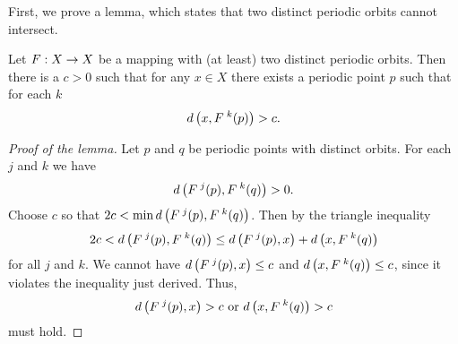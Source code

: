 \documentclass[10pt,draft,twoside]{book}
\begin{document}
First, we prove a lemma, which states that two distinct periodic orbits cannot intersect.
\begin{lemma}
  Let $F: X\rightarrow X$ be a mapping with (at least) two distinct periodic orbits.
  Then there is a $c > 0$ such that for any $x\in X$ there exists a periodic
  point $p$ such that for each $k$
  \begin{equation*}
    d\left( x, F^{\;k}(p) \right) > c.
  \end{equation*}
  \label{lem:dev1}
  \begin{proof}[Proof of the lemma]
    Let $p$ and $q$ be periodic points with distinct orbits. For each $j$ and $k$ we have
    \begin{equation*}
      d\left( F^{\;j}(p), F^{\;k}(q) \right) > 0.
    \end{equation*}
    Choose $c$ so that $2c < \min d\left( F^{\;j}(p),F^{\;k}(q) \right)$.
    Then by the triangle inequality
    \begin{equation*}
      2c < d\left( F^{\;j}(p),F^{\;k}(q) \right) \leq d\left( F^{\;j}(p),x \right) + d\left( x,F^{\;k}(q) \right)
    \end{equation*}
    for all $j$ and $k$.
    We cannot have $d\left( F^{\;j}(p),x \right) \leq c$ and $d\left( x,F^{\;k}(q) \right) \leq c$, since it violates the inequality just derived.
    Thus,
    \begin{equation*}
      d\left( F^{\;j}(p),x \right) > c \mbox{ or } d\left( x,F^{\;k}(q) \right) > c
    \end{equation*}
    must hold.
  \end{proof}
\end{lemma}
\end{document}
